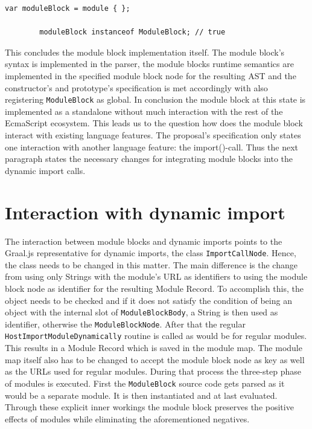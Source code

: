  \begin{lstlisting}[caption={ModuleBlock working as global in JavaScript}, label={fig:globModule}]
        var moduleBlock = module { };
        
        moduleBlock instanceof ModuleBlock; // true
\end{lstlisting}

This concludes the module block implementation itself. The module block's syntax is implemented in the parser, the module blocks runtime semantics are implemented in the specified module block node for the resulting AST and the constructor's and prototype's specification is met accordingly with also registering \texttt{ModuleBlock} as global. In conclusion the module block at this state is implemented as a standalone without much interaction with the rest of the EcmaScript ecosystem. This leads us to the question how does the module block interact with existing language features. The proposal's specification only states one interaction with another language feature: the import()-call. Thus the next paragraph states the necessary changes for integrating module blocks into the dynamic import calls.

\section{Interaction with dynamic import}

The interaction between module blocks and dynamic imports points to the Graal.js representative for dynamic imports, the class \texttt{ImportCallNode}. Hence, the class needs to be changed in this matter. The main difference is the change from using only Strings with the module's URL as identifiers to using the module block node as identifier for the resulting Module Record. To accomplish this, the object needs to be checked and if it does not satisfy the condition of being an object with the internal slot of \texttt{ModuleBlockBody}, a String is then used as identifier, otherwise the \texttt{ModuleBlockNode}. After that the regular \texttt{HostImportModuleDynamically} routine is called as would be for regular modules. This results in a Module Record which is saved in the module map. The module map itself also has to be changed to accept the module block node as key as well as the URLs used for regular modules. During that process the three-step phase of modules is executed. First the \texttt{ModuleBlock} source code gets parsed as it would be a separate module. It is then instantiated and at last evaluated. Through these explicit inner workings the module block preserves the positive effects of modules while eliminating the aforementioned negatives.

